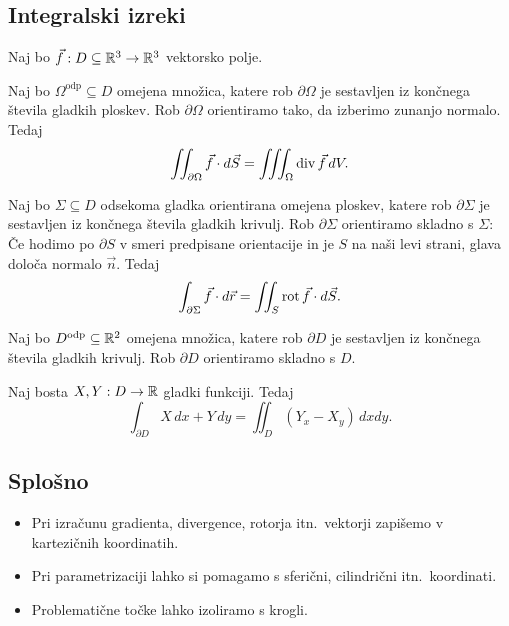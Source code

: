 \subsection{Integralski izreki}
Naj bo \(\vec{f}: D \subseteq \mathbb{R}^3 \to \mathbb{R}^3\) vektorsko polje.

\begin{izrek}
    Naj bo \(\Omega^\text{odp} \subseteq D\) omejena množica, katere rob \(\partial \Omega\) je sestavljen iz končnega števila gladkih ploskev. Rob \(\partial \Omega\) orientiramo tako, da izberimo zunanjo normalo. Tedaj
    \[
        \iint_{\partial \Omega} \vec{f} \cdot d\vec{S} = \iiint_{\Omega} \operatorname{div} \vec{f} \, dV.
    \]
\end{izrek}

\begin{izrek}
    Naj bo \(\Sigma \subseteq D\) odsekoma gladka orientirana omejena ploskev, katere rob \(\partial \Sigma\) je sestavljen iz končnega števila gladkih krivulj. Rob \(\partial \Sigma\) orientiramo skladno s \(\Sigma\): Če hodimo po \(\partial S\) v smeri predpisane orientacije in je \(S\) na naši levi strani, glava določa normalo \(\vec{n}\). Tedaj
    \[
        \int_{\partial \Sigma} \vec{f} \cdot d\vec{r} = \iint_{S} \operatorname{rot} \vec{f} \cdot d \vec{S}.
    \]
\end{izrek}

\begin{izrek} 
    Naj bo \(D^\text{odp} \subseteq \mathbb{R}^2\) omejena množica, katere rob \(\partial D\) je sestavljen iz končnega števila gladkih krivulj. Rob \(\partial D\) orientiramo skladno s \(D\). 
    
    Naj bosta \(X, Y: D \to \mathbb{R}\) gladki funkciji. Tedaj
    \[
        \int_{\partial D} X \, dx + Y \, dy = \iint_D (Y_x - X_y) \, dxdy.
    \]
\end{izrek}

\subsection{Splošno}
\begin{itemize}
    \item Pri izračunu gradienta, divergence, rotorja itn.\ vektorji zapišemo v kartezičnih koordinatih.
    \item Pri parametrizaciji lahko si pomagamo s sferični, cilindrični itn.\ koordinati.
    \item Problematične točke lahko izoliramo s krogli.
\end{itemize}

